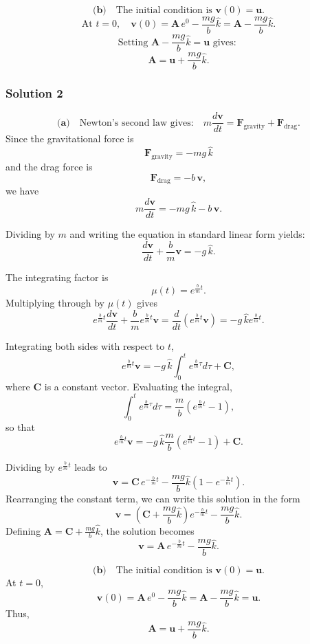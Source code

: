 \documentclass{article}
\begin{document}
\[
\textbf{(b)}\quad \text{The initial condition is } \mathbf{v}(0) = \mathbf{u}.
\]
\[
\text{At } t = 0, \quad \mathbf{v}(0) = \mathbf{A}\,e^0 - \frac{mg}{b}\hat{k} = \mathbf{A} - \frac{mg}{b}\hat{k}.
\]
\[
\text{Setting } \mathbf{A} - \frac{mg}{b}\hat{k} = \mathbf{u} \text{ gives: }
\]
\[
\mathbf{A} = \mathbf{u} + \frac{mg}{b}\hat{k}.
\]

\subsubsection{Solution 2}
\[
\textbf{(a)}\quad \text{Newton's second law gives:} \quad m\frac{d\mathbf{v}}{dt} = \mathbf{F}_{\text{gravity}} + \mathbf{F}_{\text{drag}}.
\]
Since the gravitational force is 
\[
\mathbf{F}_{\text{gravity}} = -mg\,\hat{k}
\]
and the drag force is 
\[
\mathbf{F}_{\text{drag}} = -b\,\mathbf{v},
\]
we have
\[
m\frac{d\mathbf{v}}{dt} = -mg\,\hat{k} - b\,\mathbf{v}.
\]

Dividing by \(m\) and writing the equation in standard linear form yields:
\[
\frac{d\mathbf{v}}{dt} + \frac{b}{m}\mathbf{v} = -g\,\hat{k}.
\]

The integrating factor is 
\[
\mu(t)=e^{\frac{b}{m}t}.
\]
Multiplying through by \(\mu(t)\) gives
\[
e^{\frac{b}{m}t}\frac{d\mathbf{v}}{dt} + \frac{b}{m}e^{\frac{b}{m}t}\mathbf{v} = \frac{d}{dt}\left(e^{\frac{b}{m}t}\mathbf{v}\right) = -g\,\hat{k}e^{\frac{b}{m}t}.
\]

Integrating both sides with respect to \(t\),
\[
e^{\frac{b}{m}t}\mathbf{v} = -g\,\hat{k}\int_0^t e^{\frac{b}{m}\tau} d\tau + \mathbf{C},
\]
where \(\mathbf{C}\) is a constant vector. Evaluating the integral,
\[
\int_0^t e^{\frac{b}{m}\tau} d\tau = \frac{m}{b}\left(e^{\frac{b}{m}t}-1\right),
\]
so that
\[
e^{\frac{b}{m}t}\mathbf{v} = -g\,\hat{k}\frac{m}{b}\left(e^{\frac{b}{m}t}-1\right) + \mathbf{C}.
\]

Dividing by \(e^{\frac{b}{m}t}\) leads to
\[
\mathbf{v} = \mathbf{C}\,e^{-\frac{b}{m}t} - \frac{mg}{b}\hat{k}\left(1 - e^{-\frac{b}{m}t}\right).
\]
Rearranging the constant term, we can write this solution in the form
\[
\mathbf{v} = \left(\mathbf{C} + \frac{mg}{b}\hat{k}\right)e^{-\frac{b}{m}t} - \frac{mg}{b}\hat{k}.
\]
Defining \(\mathbf{A} = \mathbf{C} + \frac{mg}{b}\hat{k}\), the solution becomes
\[
\mathbf{v} = \mathbf{A}\,e^{-\frac{b}{m}t} - \frac{mg}{b}\hat{k}.
\]

\[
\textbf{(b)}\quad \text{The initial condition is } \mathbf{v}(0)=\mathbf{u}.
\]
At \(t=0\),
\[
\mathbf{v}(0) = \mathbf{A}\,e^0 - \frac{mg}{b}\hat{k} = \mathbf{A} - \frac{mg}{b}\hat{k} = \mathbf{u}.
\]
Thus,
\[
\mathbf{A} = \mathbf{u} + \frac{mg}{b}\hat{k}.
\]
\end{document}
